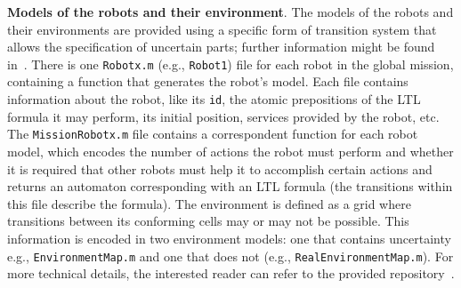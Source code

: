 \textbf{Models of the robots and their environment}. 
The models of the robots and their environments are provided using a specific form of transition system that allows the specification of uncertain parts; further information might be found in~\cite{menghi2018multi}.
There is one \texttt{Robotx.m} (e.g., \texttt{Robot1}) file for each robot in the global mission, containing a function that generates the robot's model.
Each file contains information about the robot, like its \texttt{id}, the atomic prepositions of the LTL formula it may perform, its initial position, services provided by the robot, etc.
The  \texttt{MissionRobotx.m} file contains a correspondent function for each robot model, which
encodes the number of actions the robot must perform and whether it is required that other robots must help it to accomplish certain actions and returns an automaton corresponding with an LTL formula (the transitions within this file describe the formula).
The environment is defined as a grid where transitions between its conforming cells may or may not be possible.
This information is encoded in two environment models: one that contains uncertainty e.g., \texttt{EnvironmentMap.m} and one that does not (e.g., \texttt{RealEnvironmentMap.m}).
For more technical details, the interested reader can refer to the provided repository~\cite{repo}.


